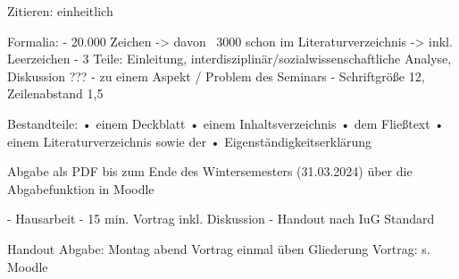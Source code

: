 
Zitieren: einheitlich

Formalia:
- 20.000 Zeichen
-> davon ~3000 schon im Literaturverzeichnis
-> inkl. Leerzeichen
-  3 Teile: Einleitung, interdisziplinär/sozialwissenschaftliche Analyse, Diskussion ???
- zu einem Aspekt / Problem des Seminars
- Schriftgröße 12, Zeilenabstand 1,5

Bestandteile:
• einem Deckblatt
• einem Inhaltsverzeichnis
• dem Fließtext
• einem Literaturverzeichnis sowie der
• Eigenständigkeitserklärung

Abgabe
als PDF bis zum Ende des Wintersemesters (31.03.2024) über die Abgabefunktion in Moodle


- Hausarbeit
- 15 min. Vortrag inkl. Diskussion
- Handout nach IuG Standard

Handout Abgabe: Montag abend
Vortrag einmal üben
Gliederung Vortrag: s. Moodle